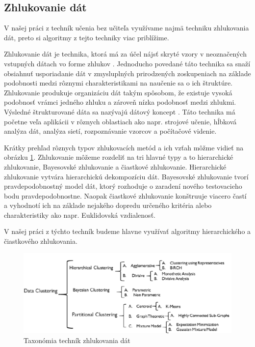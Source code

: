 \subsection{Zhlukovanie dát}
V našej práci z techník učenia bez učiteľa využívame najmä techniku zhlukovania dát, preto si algoritmy z tejto techniky viac priblížime.\par
Zhlukovanie dát je technika, ktorá má za účel nájsť skryté vzory v neoznačených vstupných dátach vo forme zhlukov \cite{zhluk_basic}. Jednoducho povedané táto technika sa snaží obsiahnuť usporiadanie dát v zmysluplných prirodzených zoskupeniach na základe podobnosti medzi rôznymi charakteristikami na naučenie sa o ich štruktúre. Zhlukovanie produkuje organizáciu dát takým spôsobom, že existuje vysoká podobnosť vrámci jedného zhluku a zároveň nízka podobnosť medzi zhlukmi. Výsledné štrukturované dáta sa nazývajú dátový koncept \cite{data_concept}. Táto technika má početne veľa aplikácii v rôznych oblastiach ako napr. strojové učenie, hĺbková analýza dát, analýza sietí, rozpoznávanie vzorcov a počítačové videnie.\par
Krátky prehľad rôznych typov zhlukovacích metód a ich vzťah môžme vidieť na obrázku \ref{img:zhluk}. Zhlukovanie môžeme rozdeliť na tri hlavné typy a to hierarchické zhlukovanie, Bayesovské zhlukovanie a čiastkové zhlukovanie. Hierarchické zhlukovanie vytvára hierarchickú dekompozíciu dát. Bayesovské zhlukovanie tvorí pravdepodobnostný model dát, ktorý rozhoduje o zaradení nového testovacieho bodu pravdepodobnostne. Naopak čiastkové zhlukovanie konštruuje viacero častí a vyhodnotí ich na základe nejakého dopredu určeného kritéria alebo charakteristiky ako napr. Euklidovská vzdialenosť.\par
V našej práci z týchto techník budeme hlavne využívať algoritmy hierarchického a čiastkového zhlukovania.
\begin{figure}[H]
	\begin{center}
		\includegraphics[scale=0.55]{img/tax_zhluk.png}
		\caption{Taxonómia techník zhlukovania dát}
		\label{img:zhluk}
	\end{center}
\end{figure}
